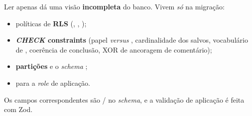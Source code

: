 \begin{atencao}
Ler apenas  dá uma visão \textbf{incompleta} do banco. Vivem
\emph{só} na migração:

\begin{itemize}
  \item políticas de \textbf{RLS} (, , );
  \item \textbf{\emph{CHECK} constraints} (papel \emph{versus} ,
    cardinalidade dos salvos, vocabulário de , coerência de
    conclusão, XOR de ancoragem de comentário);
  \item \textbf{partições} e o \emph{schema} ;
  \item \textbf{} para a \emph{role} de aplicação.
\end{itemize}

Os campos correspondentes são / no \emph{schema}, e a
validação de aplicação é feita com Zod.
\end{atencao}
